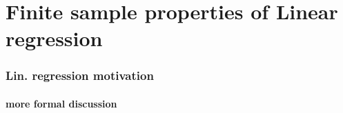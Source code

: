 
\part*{Finite sample properties of Linear regression}%

\section{Lin. regression motivation}
\subsection{more formal discussion}

